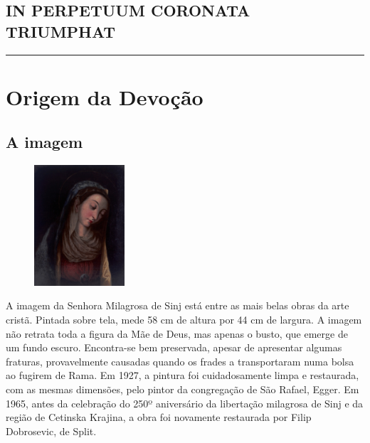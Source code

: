 \documentclass[a4paper,14pt]{extarticle} \usepackage[utf8]{inputenc}
\begin{document}
\subsection*{IN PERPETUUM CORONATA TRIUMPHAT}


\par\noindent\rule{\textwidth}{0.4pt}

\tableofcontents
\thispagestyle{empty}

\newpage

\section{Origem da Devoção}

\subsection{A imagem}

\begin{figure} %
    \centering
    \includegraphics[width=0.30\textwidth]{assets/gospa.jpg}
\end{figure}

A imagem da Senhora Milagrosa de Sinj está entre as mais belas obras da arte cristã. Pintada sobre tela, mede 58 cm de altura por 44 cm de largura. A imagem não retrata toda a figura da Mãe de Deus, mas apenas o busto, que emerge de um fundo escuro. Encontra-se bem preservada, apesar de apresentar algumas fraturas, provavelmente causadas quando os frades a transportaram numa bolsa ao fugirem de Rama. Em 1927, a pintura foi cuidadosamente limpa e restaurada, com as mesmas dimensões, pelo pintor da congregação de São Rafael, Egger. Em 1965, antes da celebração do 250º aniversário da libertação milagrosa de Sinj e da região de Cetinska Krajina, a obra foi novamente restaurada por Filip Dobrosevic, de Split.
\end{document}
